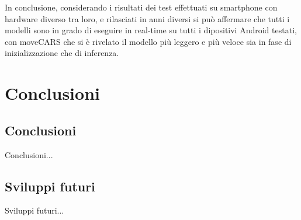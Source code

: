 \documentclass[12pt,italian]{report}
\begin{document}
In conclusione, considerando i risultati dei test effettuati su smartphone con hardware diverso tra loro, e rilasciati in anni diversi si può affermare che tutti i modelli sono in grado di eseguire in real-time su tutti i dipositivi Android testati, con moveCARS che si è rivelato il modello più leggero e più veloce sia in fase di inizializzazione che di inferenza.


% 
% 

\chapter{Conclusioni} \label{chap:conclusioni}

\section{Conclusioni}

Conclusioni...

\section{Sviluppi futuri}

Sviluppi futuri...



%
%



\end{document}
